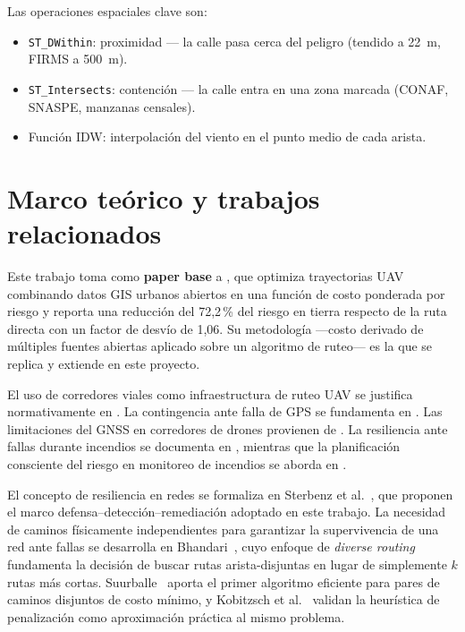 \documentclass[conference]{IEEEtran}
\begin{document}
Las operaciones espaciales clave son:
\begin{itemize}[itemsep=1pt]
\item \texttt{ST\_DWithin}: proximidad --- la calle pasa cerca del peligro (tendido a 22~m, FIRMS a 500~m).
\item \texttt{ST\_Intersects}: contención --- la calle entra en una zona marcada (CONAF, SNASPE, manzanas censales).
\item Función IDW: interpolación del viento en el punto medio de cada arista.
\end{itemize}

\section{Marco teórico y trabajos relacionados}

Este trabajo toma como \textbf{paper base} a \cite{brassel2025}, que optimiza trayectorias UAV combinando datos GIS urbanos abiertos en una función de costo ponderada por riesgo y reporta una reducción del 72,2\,\% del riesgo en tierra respecto de la ruta directa con un factor de desvío de 1,06. Su metodología ---costo derivado de múltiples fuentes abiertas aplicado sobre un algoritmo de ruteo--- es la que se replica y extiende en este proyecto.

El uso de corredores viales como infraestructura de ruteo UAV se justifica normativamente en \cite{yang2026}. La contingencia ante falla de GPS se fundamenta en \cite{almozel2025}. Las limitaciones del GNSS en corredores de drones provienen de \cite{sinha2024}. La resiliencia ante fallas durante incendios se documenta en \cite{raj2025}, mientras que la planificación consciente del riesgo en monitoreo de incendios se aborda en \cite{huang2026}.

El concepto de resiliencia en redes se formaliza en Sterbenz et al.~\cite{sterbenz2010}, que proponen el marco defensa--detección--remediación adoptado en este trabajo. La necesidad de caminos físicamente independientes para garantizar la supervivencia de una red ante fallas se desarrolla en Bhandari~\cite{bhandari1999}, cuyo enfoque de \textit{diverse routing} fundamenta la decisión de buscar rutas arista-disjuntas en lugar de simplemente $k$ rutas más cortas. Suurballe~\cite{suurballe1974} aporta el primer algoritmo eficiente para pares de caminos disjuntos de costo mínimo, y Kobitzsch et al.~\cite{kobitzsch2013} validan la heurística de penalización como aproximación práctica al mismo problema.
\end{document}
